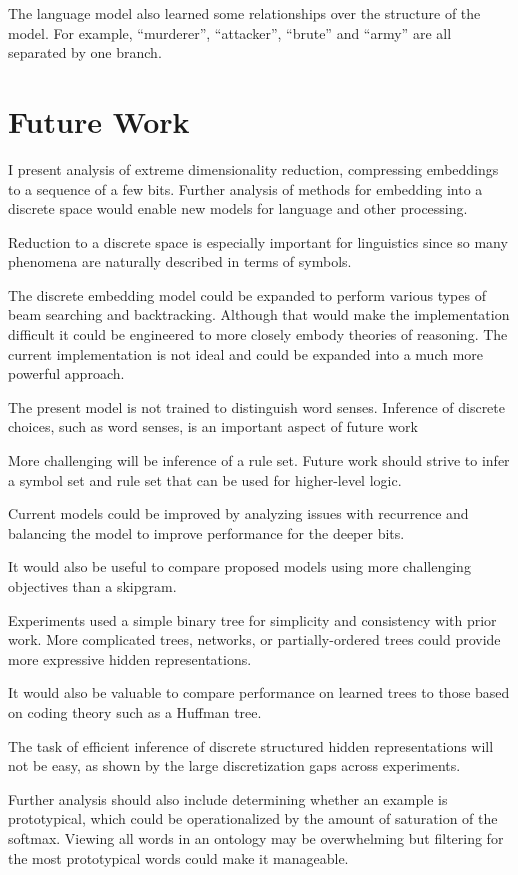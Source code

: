 \documentclass[sigconf]{acmart}
\begin{document}
The language model also learned some relationships over the structure of the model. For example, ``murderer'', ``attacker'', ``brute'' and ``army'' are all separated by one branch.

\section{Future Work}

I present analysis of extreme dimensionality reduction, compressing embeddings to a sequence of a few bits. Further analysis of methods for embedding into a discrete space would enable new models for language and other processing.

Reduction to a discrete space is especially important for linguistics since so many phenomena are naturally described in terms of symbols.

The discrete embedding model could be expanded to perform various types of beam searching and backtracking. Although that would make the implementation difficult it could be engineered to more closely embody theories of reasoning. The current implementation is not ideal and could be expanded into a much more powerful approach.

The present model is not trained to distinguish word senses. Inference of discrete choices, such as word senses, is an important aspect of future work

More challenging will be inference of a rule set. Future work should strive to infer a symbol set and rule set that can be used for higher-level logic.

Current models could be improved by analyzing issues with recurrence and balancing the model to improve performance for the deeper bits.

It would also be useful to compare proposed models using more challenging objectives than a skipgram.

Experiments used a simple binary tree for simplicity and consistency with prior work. More complicated trees, networks, or partially-ordered trees could provide more expressive hidden representations.

It would also be valuable to compare performance on learned trees to those based on coding theory such as a Huffman tree.

The task of efficient inference of discrete structured hidden representations will not be easy, as shown by the large discretization gaps across experiments.

Further analysis should also include determining whether an example is prototypical, which could be operationalized by the amount of saturation of the softmax. Viewing all words in an ontology may be overwhelming but filtering for the most prototypical words could make it manageable.
\end{document}
